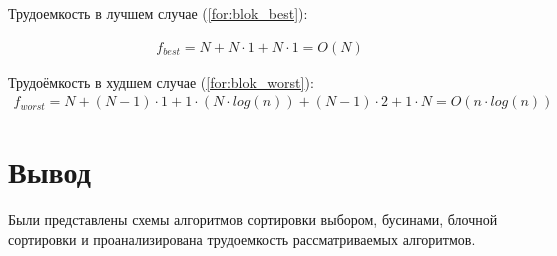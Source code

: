 Трудоемкость в лучшем случае (\ref{for:blok_best}):

\begin{gather}
	\label{for:blok_best}
	f_{best} = N + N \cdot 1 + N \cdot 1 = O(N)
\end{gather}


Трудоёмкость в худшем случае (\ref{for:blok_worst}):
\begin{gather}
	\label{for:blok_worst}
	f_{worst} = N + (N - 1) \cdot 1 + 1 \cdot (N \cdot log(n)) + (N - 1) \cdot 2 + 1 \cdot N = O(n \cdot log(n))
\end{gather}

\section*{Вывод}

Были представлены схемы алгоритмов сортировки выбором, бусинами, блочной сортировки и проанализирована трудоемкость рассматриваемых алгоритмов.
